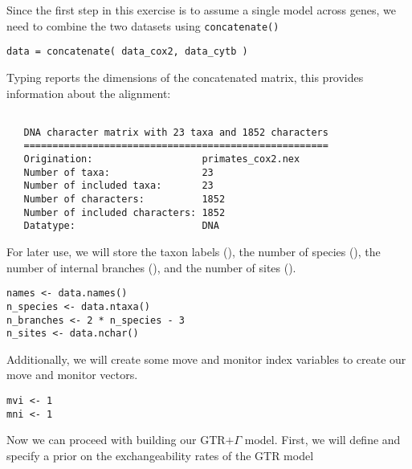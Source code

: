 Since the first step in this exercise is to assume a single model across genes, we need to combine the two datasets using {\tt concatenate()}

{\tt \begin{snugshade*}
\begin{lstlisting}
data = concatenate( data_cox2, data_cytb )
\end{lstlisting}
\end{snugshade*}}

Typing  reports the dimensions of the concatenated matrix, this provides information about the alignment:


{\tt \begin{snugshade*}
\begin{lstlisting}

   DNA character matrix with 23 taxa and 1852 characters
   =====================================================
   Origination:                   primates_cox2.nex
   Number of taxa:                23
   Number of included taxa:       23
   Number of characters:          1852
   Number of included characters: 1852
   Datatype:                      DNA

\end{lstlisting}
\end{snugshade*}}

For later use, we will store the taxon labels (), the number of species (), the number of internal branches (), and the number of sites ().

{\tt \begin{snugshade*}
\begin{lstlisting}
names <- data.names()
n_species <- data.ntaxa()
n_branches <- 2 * n_species - 3
n_sites <- data.nchar()
\end{lstlisting}
\end{snugshade*}}

Additionally, we will create some move and monitor index variables to create our move and monitor vectors.

{\tt \begin{snugshade*}
\begin{lstlisting}
mvi <- 1
mni <- 1
\end{lstlisting}
\end{snugshade*}}

Now we can proceed with building our GTR$+\Gamma$ model.
First, we will define and specify a prior on the exchangeability rates of the GTR model

